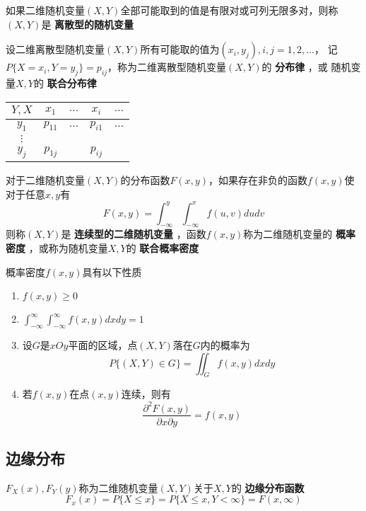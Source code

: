 \documentclass[11pt]{article}
\begin{document}
如果二维随机变量\((X,Y)\)全部可能取到的值是有限对或可列无限多对，则称
\((X,Y)\)是 \textbf{离散型的随机变量}

设二维离散型随机变量\((X,Y)\)所有可能取的值为\((x_i,y_j),i,j=1,2,\dots\)，
记\(P\{X=x_i,Y=y_j\}=p_{ij}\)，称为二维离散型随机变量\((X,Y)\)的 \textbf{分布律} ，或
随机变量\(X,Y\)的 \textbf{联合分布律}

\begin{center}
\begin{tabular}{c|cccc}
\(Y,X\) & \(x_1\) & \(\dots\) & \(x_i\) & \(\dots\)\\
\hline
\(y_1\) & \(p_{11}\) & \(\dots\) & \(p_{i1}\) & \(\dots\)\\
\(\vdots\) &  &  &  & \\
\(y_j\) & \(p_{1j}\) &  & \(p_{ij}\) & \\
\end{tabular}
\end{center}

对于二维随机变量\((X,Y)\)的分布函数\(F(x,y)\)，如果存在非负的函数\(f(x,y)\)使
对于任意\(x,y\)有
\begin{equation*}
F(x,y)=\int_{-\infty}^y\int_{-\infty}^xf(u,v)dudv
\end{equation*}
则称\((X,Y)\)是 \textbf{连续型的二维随机变量} ，函数\(f(x,y)\)称为二维随机变量的 \textbf{概率
密度} ，或称为随机变量\(X,Y\)的 \textbf{联合概率密度}

概率密度\(f(x,y)\)具有以下性质
\begin{enumerate}
\item \(f(x,y)\ge0\)
\item \(\int_{-\infty}^\infty\int_{-\infty}^\infty f(x,y)dxdy=1\)
\item 设\(G\)是\(xOy\)平面的区域，点\((X,Y)\)落在\(G\)内的概率为
\begin{equation*}
P\{(X,Y)\in G\}=\iint_Gf(x,y)dxdy
\end{equation*}
\item 若\(f(x,y)\)在点\((x,y)\)连续，则有
\begin{equation*}
\frac{\partial ^2F(x,y)}{\partial x\partial y}=f(x,y)
\end{equation*}
\end{enumerate}
\subsection{边缘分布}
\label{sec:org2a7da19}
\(F_X(x),F_Y(y)\)称为二维随机变量\((X,Y)\)关于\(X,Y\)的 \textbf{边缘分布函数}
\begin{equation*}
F_x(x)=P\{X\le x\}=P\{X\le x,Y<\infty\}=F(x,\infty)
\end{equation*}
\end{document}
